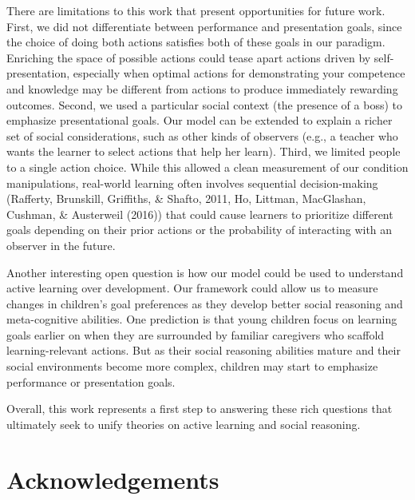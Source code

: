 \documentclass[10pt, letterpaper]{article}
\begin{document}
There are limitations to this work that present opportunities for future
work. First, we did not differentiate between performance and
presentation goals, since the choice of doing both actions satisfies
both of these goals in our paradigm. Enriching the space of possible
actions could tease apart actions driven by self-presentation,
especially when optimal actions for demonstrating your competence and
knowledge may be different from actions to produce immediately rewarding
outcomes. Second, we used a particular social context (the presence of a
boss) to emphasize presentational goals. Our model can be extended to
explain a richer set of social considerations, such as other kinds of
observers (e.g., a teacher who wants the learner to select actions that
help her learn). Third, we limited people to a single action choice.
While this allowed a clean measurement of our condition manipulations,
real-world learning often involves sequential decision-making (Rafferty,
Brunskill, Griffiths, \& Shafto, 2011, Ho, Littman, MacGlashan, Cushman,
\& Austerweil (2016)) that could cause learners to prioritize different
goals depending on their prior actions or the probability of interacting
with an observer in the future.

Another interesting open question is how our model could be used to
understand active learning over development. Our framework could allow
us to measure changes in children's goal preferences as they develop
better social reasoning and meta-cognitive abilities. One prediction is
that young children focus on learning goals earlier on when they are
surrounded by familiar caregivers who scaffold learning-relevant
actions. But as their social reasoning abilities mature and their social
environments become more complex, children may start to emphasize
performance or presentation goals.

Overall, this work represents a first step to answering these rich
questions that ultimately seek to unify theories on active learning and
social reasoning.

\vspace{1em}
\vspace{1em} \noindent

\section{Acknowledgements}\label{acknowledgements}
\end{document}
